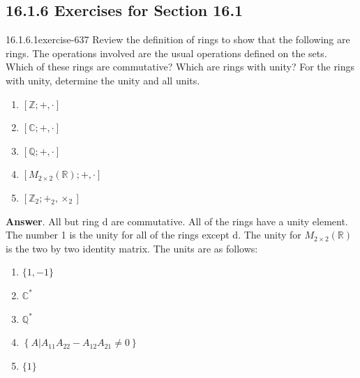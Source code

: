 \documentclass[twoside,10pt,]{book}
\numberwithin{equation}{section}
\begin{document}
\subsection*{16.1.6 Exercises for Section 16.1}
\begin{divisionsolution}{16.1.6.1}{}{exercise-637}%
\hypertarget{p-5772}{}%
Review the definition of rings to show that the following are rings. The operations involved are the usual operations defined on the sets. Which of these rings are commutative? Which are rings with unity? For the rings with unity, determine the unity and all units.\leavevmode%
\begin{enumerate}[label=(\alph*)]
\item\hypertarget{li-2533}{}\hypertarget{p-5773}{}%
\([\mathbb{Z};+,\cdot ]\)%
\item\hypertarget{li-2534}{}\hypertarget{p-5774}{}%
\([\mathbb{C};+,\cdot ]\)%
\item\hypertarget{li-2535}{}\hypertarget{p-5775}{}%
\([\mathbb{Q};+,\cdot ]\)%
\item\hypertarget{li-2536}{}\hypertarget{p-5776}{}%
\(\left[M_{2\times 2}(\mathbb{R});+, \cdot \right]\)%
\item\hypertarget{li-2537}{}\hypertarget{p-5777}{}%
\(\left[\mathbb{Z}_2;+_2,\times_2\right]\)%
\end{enumerate}
%
\par\smallskip%
\noindent\textbf{Answer}.\quad%
\hypertarget{p-5778}{}%
All but ring d are commutative. All of the rings have a unity element. The number 1 is the unity for all of the rings except d. The unity for \(M_{2\times 2}(\mathbb{R})\) is the two by two identity matrix. The units are as follows:\leavevmode%
\begin{multicols}{2}
\begin{enumerate}[label=(\alph*)]
\item\hypertarget{li-2538}{}\hypertarget{p-5779}{}%
\(\{1, -1\}\)%
\item\hypertarget{li-2539}{}\hypertarget{p-5780}{}%
\(\mathbb{C}^*\)%
\item\hypertarget{li-2540}{}\hypertarget{p-5781}{}%
\(\mathbb{Q}^*\)%
\item\hypertarget{li-2541}{}\hypertarget{p-5782}{}%
\(\left\{A \left| A_{11}A_{22}-A_{12}A_{21}\neq 0\right.\right\}\)%
\item\hypertarget{li-2542}{}\hypertarget{p-5783}{}%
\(\{1\}\)%
\end{enumerate}
\end{multicols}
%
\end{divisionsolution}%
\end{document}
